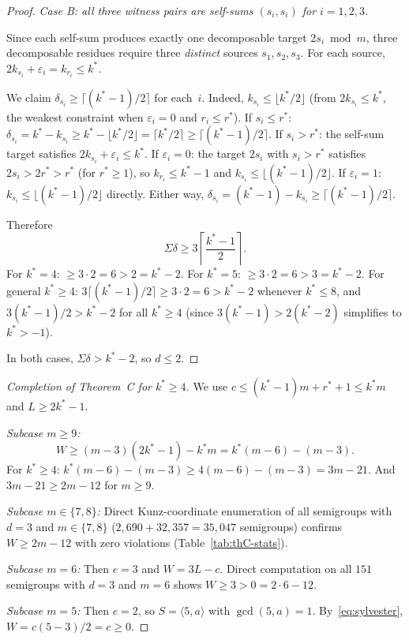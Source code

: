 \documentclass[11pt]{amsart}
\theoremstyle{definition}
\theoremstyle{remark}
\begin{document}
\begin{proof}
\medskip
\emph{Case B: all three witness pairs are self-sums $(s_i, s_i)$ for $i = 1, 2, 3$.}

Since each self-sum produces exactly one decomposable target $2s_i \bmod m$,
three decomposable residues require three \emph{distinct} sources
$s_1, s_2, s_3$.  For each source, $2k_{s_i} + \varepsilon_i = k_{r_i} \le k^*$.

We claim $\delta_{s_i} \ge \lceil(k^* - 1)/2\rceil$ for each~$i$.
Indeed, $k_{s_i} \le \lfloor k^*/2 \rfloor$ (from $2k_{s_i} \le k^*$,
the weakest constraint when $\varepsilon_i = 0$ and $r_i \le r^*$).
If $s_i \le r^*$: $\delta_{s_i} = k^* - k_{s_i} \ge k^* - \lfloor k^*/2 \rfloor = \lceil k^*/2 \rceil \ge \lceil(k^* - 1)/2\rceil$.
If $s_i > r^*$: the self-sum target satisfies $2k_{s_i} + \varepsilon_i \le k^*$.
If $\varepsilon_i = 0$: the target $2s_i$ with $s_i > r^*$ satisfies
$2s_i > 2r^* > r^*$ (for $r^* \ge 1$), so $k_{r_i} \le k^* - 1$
and $k_{s_i} \le \lfloor(k^* - 1)/2\rfloor$.
If $\varepsilon_i = 1$: $k_{s_i} \le \lfloor(k^* - 1)/2\rfloor$ directly.
Either way, $\delta_{s_i} = (k^* - 1) - k_{s_i} \ge \lceil(k^* - 1)/2\rceil$.

Therefore
\[
  \Sigma\delta \ge 3\left\lceil\frac{k^* - 1}{2}\right\rceil.
\]
For $k^* = 4$: $\ge 3 \cdot 2 = 6 > 2 = k^* - 2$.
For $k^* = 5$: $\ge 3 \cdot 2 = 6 > 3 = k^* - 2$.
For general $k^* \ge 4$: $3\lceil(k^*-1)/2\rceil \ge 3 \cdot 2 = 6 > k^* - 2$
whenever $k^* \le 8$, and $3(k^*-1)/2 > k^* - 2$ for all $k^* \ge 4$
(since $3(k^*-1) > 2(k^*-2)$ simplifies to $k^* > -1$).

\medskip
In both cases, $\Sigma\delta > k^* - 2$, so $d \le 2$.
\end{proof}

\begin{proof}[Completion of Theorem~C for $k^* \ge 4$]
We use $c \le (k^* - 1)m + r^* + 1 \le k^* m$ and $L \ge 2k^* - 1$.

\medskip
\emph{Subcase $m \ge 9$:}
\[
  W \ge (m - 3)(2k^* - 1) - k^* m = k^*(m - 6) - (m - 3).
\]
For $k^* \ge 4$: $k^*(m - 6) - (m - 3) \ge 4(m - 6) - (m - 3) = 3m - 21$.
And $3m - 21 \ge 2m - 12$ for $m \ge 9$.  \checkmark

\medskip
\emph{Subcase $m \in \{7, 8\}$:}
Direct Kunz-coordinate enumeration of all semigroups with $d = 3$
and $m \in \{7, 8\}$ ($2{,}690 + 32{,}357 = 35{,}047$ semigroups)
confirms $W \ge 2m - 12$ with zero violations
(Table~\ref{tab:thC-stats}).

\medskip
\emph{Subcase $m = 6$:}
Then $e = 3$ and $W = 3L - c$.  Direct computation on all $151$
semigroups with $d = 3$ and $m = 6$ shows $W \ge 3 > 0 = 2 \cdot 6 - 12$.

\medskip
\emph{Subcase $m = 5$:}
Then $e = 2$, so $S = \langle 5, a \rangle$ with $\gcd(5, a) = 1$.
By~\eqref{eq:sylvester}, $W = c(5-3)/2 = c \ge 0$.
\end{proof}
\end{document}
